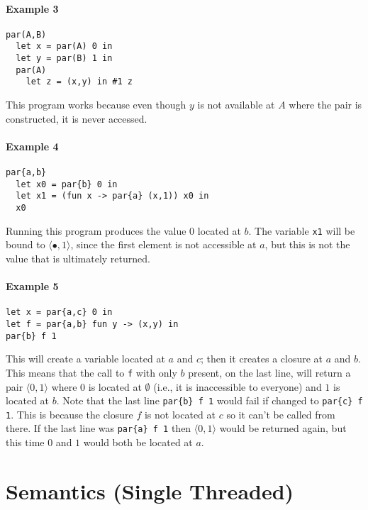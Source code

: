 \documentclass[10pt]{article}
\newcommand{\epair}[2]{\ensuremath{\langle {#1}, {#2} \rangle}}
\newcommand{\vcrash}{\ensuremath{\bullet}}
\begin{document}
\paragraph{Example 3}
\begin{verbatim}
par(A,B) 
  let x = par(A) 0 in
  let y = par(B) 1 in
  par(A) 
    let z = (x,y) in #1 z
\end{verbatim}
This program works because even though $y$ is not available at $A$
where the pair is constructed, it is never accessed.

\paragraph{Example 4}
\begin{verbatim}
par{a,b}
  let x0 = par{b} 0 in
  let x1 = (fun x -> par{a} (x,1)) x0 in
  x0
\end{verbatim}
Running this program produces the value $0$ located at $b$. The
variable \texttt{x1} will be bound to $\epair{\vcrash}{1}$, since the
first element is not accessible at $a$, but this is not the value that
is ultimately returned.

\paragraph{Example 5}
\begin{verbatim}
let x = par{a,c} 0 in
let f = par{a,b} fun y -> (x,y) in
par{b} f 1
\end{verbatim}
This will create a variable located at $a$ and $c$; then it creates a
closure at $a$ and $b$. This means that the call to \texttt{f} with
only $b$ present, on the last line, will return a pair $\epair{0}{1}$
where $0$ is located at $\emptyset$ (i.e., it is inaccessible to
everyone) and $1$ is located at $b$. Note that the last line
\texttt{par\{b\} f 1} would fail if changed to \texttt{par\{c\} f
  1}. This is because the closure $f$ is not located at $c$ so it
can't be called from there. If the last line was \texttt{par\{a\} f 1}
then $\epair{0}{1}$ would be returned again, but this time $0$ and $1$
would both be located at $a$.

\section{Semantics (Single Threaded)}
\label{sec:STsemantics}
\end{document}
